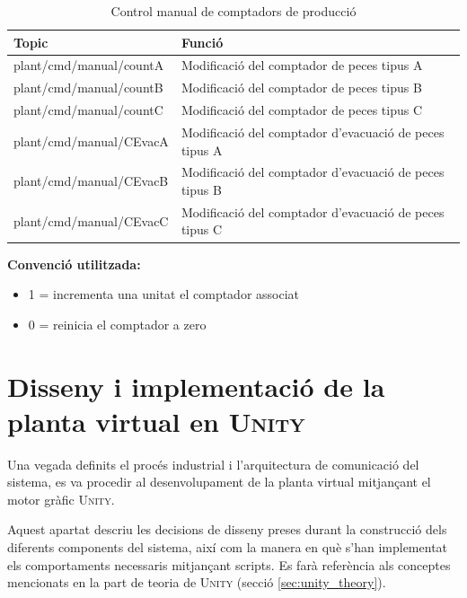 \documentclass[a4paper,11pt,DIV=13,headings=normal,abstract=true,twoside=semi]{article}
\newcommand{\acro}[1]{\textsc{#1}}
\begin{document}
\begin{table}[H]
\centering
\small
\caption{Control manual de comptadors de producció}
\label{tab:mqtt_manual_counters}
\begin{tabular}{|p{4.5cm}|p{8.5cm}|}
\hline
\textbf{Topic} & \textbf{Funció} \\ \hline

plant/cmd/manual/countA & Modificació del comptador de peces tipus A \\ \hline

plant/cmd/manual/countB & Modificació del comptador de peces tipus B \\ \hline

plant/cmd/manual/countC & Modificació del comptador de peces tipus C \\ \hline

plant/cmd/manual/CEvacA & Modificació del comptador d'evacuació de peces tipus A \\ \hline

plant/cmd/manual/CEvacB & Modificació del comptador d'evacuació de peces tipus B \\ \hline

plant/cmd/manual/CEvacC & Modificació del comptador d'evacuació de peces tipus C \\ \hline
\end{tabular}
\end{table}

\textbf{Convenció utilitzada:}

\begin{itemize}
\item 1 = incrementa una unitat el comptador associat
\item 0 = reinicia el comptador a zero
\end{itemize}


\newpage
\section{Disseny i implementació de la planta virtual en \acro{Unity}}
\label{sec:disseny_unity}
Una vegada definits el procés industrial i l'arquitectura de comunicació del sistema, es va procedir al desenvolupament de la planta virtual mitjançant el motor gràfic \acro{Unity}.

Aquest apartat descriu les decisions de disseny preses durant la construcció dels diferents components del sistema, així com la manera en què s'han implementat els comportaments necessaris mitjançant scripts. Es farà referència als conceptes mencionats en la part de teoria de \acro{Unity} (secció \ref{sec:unity_theory}).
\end{document}
